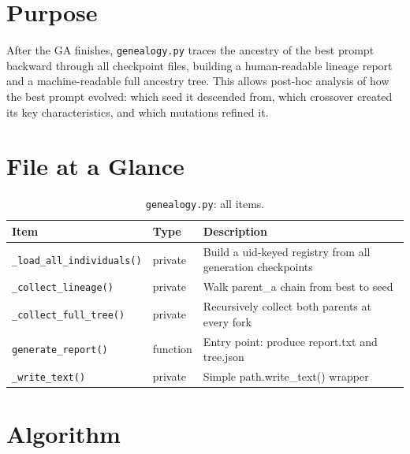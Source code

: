\documentclass[11pt,a4paper]{report}
\newcommand{\pyfile}[1]{\texttt{#1}}
\newcommand{\fn}[1]{\texttt{#1}}
\begin{document}
\section{Purpose}

After the GA finishes, \pyfile{genealogy.py} traces the ancestry of the best prompt
backward through all checkpoint files, building a human-readable lineage report and
a machine-readable full ancestry tree.  This allows post-hoc analysis of how the best
prompt evolved: which seed it descended from, which crossover created its key
characteristics, and which mutations refined it.

\section{File at a Glance}

\begin{table}[h]
\centering
\begin{tabular}{@{}llp{8cm}@{}}
\toprule
\textbf{Item} & \textbf{Type} & \textbf{Description} \\
\midrule
\fn{\_load\_all\_individuals()} & private & Build a uid-keyed registry from all generation checkpoints \\
\fn{\_collect\_lineage()}       & private & Walk parent\_a chain from best to seed \\
\fn{\_collect\_full\_tree()}    & private & Recursively collect both parents at every fork \\
\fn{generate\_report()}         & function & Entry point: produce report.txt and tree.json \\
\fn{\_write\_text()}            & private & Simple path.write\_text() wrapper \\
\bottomrule
\end{tabular}
\caption{\pyfile{genealogy.py}: all items.}
\end{table}

\section{Algorithm}
\end{document}
